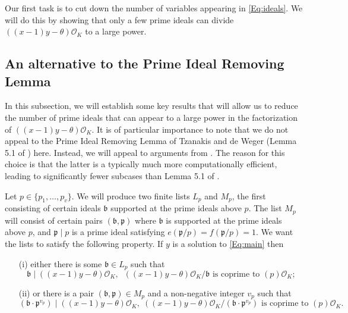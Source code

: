 {Our first task is to cut down the number of variables appearing in \eqref{Eq:ideals}. We will do this by showing that only a few prime ideals can divide $((x-1)y-\theta)\mathcal{O}_K$ to a large power. 

\subsection{An alternative to the Prime Ideal Removing Lemma}

In this subsection, we will establish some key results that will allow us to reduce  the number of prime ideals that can appear to a large power in the factorization of $((x-1)y-\theta)\mathcal{O}_K$. It is of particular importance to note that we do not appeal to the Prime Ideal Removing Lemma of Tzanakis and de Weger (Lemma 5.1 of \cite{TW3}) here. Instead, we will appeal to arguments from \cite{GhKaMaSi}. The reason for this choice is that the latter is a typically much more computationally efficient, leading to significantly fewer subcases than Lemma 5.1 of \cite{TW3}.

Let $p \in \{p_1, \dots, p_v\}$. We will produce two finite lists $L_p$ and $M_p$, the first
consisting of certain ideals $\mathfrak{b}$ supported at the prime ideals above $p$. The list $M_p$ will consist of certain pairs $(\mathfrak{b},\mathfrak{p})$ where $\mathfrak{b}$ is supported at the prime ideals above $p$, and $\mathfrak{p} \mid p$ is a prime ideal satisfying $e(\mathfrak{p}/p)=f(\mathfrak{p}/p)=1$. We want the lists to satisfy the following property. If $y$ is a solution to \eqref{Eq:main} then
\begin{enumerate}
\item[(i)] either there is some $\mathfrak{b} \in L_p$
such that
\begin{equation}\label{Eq:case1}
\mathfrak{b} \mid ((x-1) y- \theta )\mathcal{O}_K, \; \;  \text{$((x-1) y-\theta)\mathcal{O}_K/\mathfrak{b}$ is coprime to $(p)\mathcal{O}_K$};
\end{equation}
\item[(ii)] or there is a pair $(\mathfrak{b},\mathfrak{p}) \in M_p$ and a non-negative integer $v_p$ such that
\begin{equation}\label{Eq:case2}
(\mathfrak{b} \cdot \mathfrak{p}^{v_p}) \mid ((x-1) y- \theta)\mathcal{O}_K, \; \text{$((x-1) y-\theta)\mathcal{O}_K/(\mathfrak{b} \cdot \mathfrak{p}^{v_p})$ is coprime to $(p)\mathcal{O}_K$}.
\end{equation}
\end{enumerate}

}
